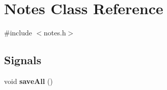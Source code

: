 \hypertarget{classNotes}{
\section{Notes Class Reference}
\label{classNotes}
}


{\ttfamily \#include $<$notes.h$>$}

\subsection*{Signals}
\begin{DoxyCompactItemize}
\item 
\hypertarget{classNotes_af64a9989ad32ae85b75bc88e60ab6647}{
void {\bfseries saveAll} ()}
\label{classNotes_af64a9989ad32ae85b75bc88e60ab6647}

\end{DoxyCompactItemize}
